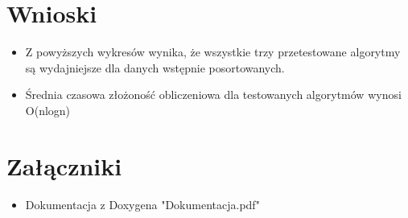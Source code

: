 \documentclass{mwart}
\begin{document}
\newpage
\section{Wnioski\label{wnioski}}
\begin{itemize}
\item Z powyższych wykresów wynika, że wszystkie trzy przetestowane algorytmy są wydajniejsze dla danych wstępnie posortowanych.
\item Średnia czasowa złożoność obliczeniowa dla testowanych algorytmów wynosi O(nlogn)
\end{itemize}

\section{Załączniki}
\begin{itemize}
\item Dokumentacja z Doxygena "Dokumentacja.pdf"
\end{itemize}
\end{document}
